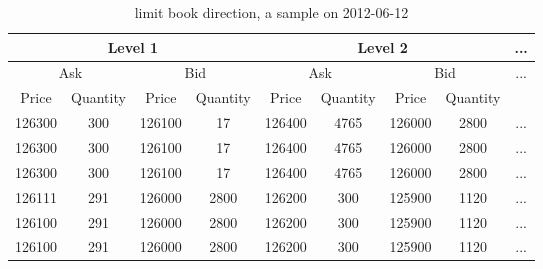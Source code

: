\begin{table}
   	\caption{limit book direction, a sample on 2012-06-12}
   	\label{tab:limit}
   	\begin{center} 
   		\begin{tabular}{c c c c c c c c c}
   			\hline
   			\multicolumn{4}{c}{ Level 1} & \multicolumn{4}{c}{Level 2}&... \\
   			\hline
   			 \multicolumn{2}{c}{Ask}  & \multicolumn{2}{c}{Bid} & \multicolumn{2}{c}{Ask}  & \multicolumn{2}{c}{Bid}&... \\
   			 \hline
   			  Price & Quantity & Price& Quantity& Price& Quantity& Price & Quantity\\
   			  126300& 300 & 126100& 17& 126400& 4765& 126000& 2800&...\\
   			  126300& 300& 126100& 17& 126400& 4765& 126000& 2800&...\\
   			  126300& 300& 126100& 17& 126400& 4765& 126000& 2800&...\\
   			  126111& 291& 126000& 2800& 126200& 300& 125900& 1120&...\\
   			  126100& 291& 126000& 2800& 126200& 300& 125900& 1120&...\\
   			  126100& 291& 126000& 2800& 126200& 300& 125900& 1120&...\\
   		
   			\hline 
   		\end{tabular}
   	\end{center}
\end{table} 

